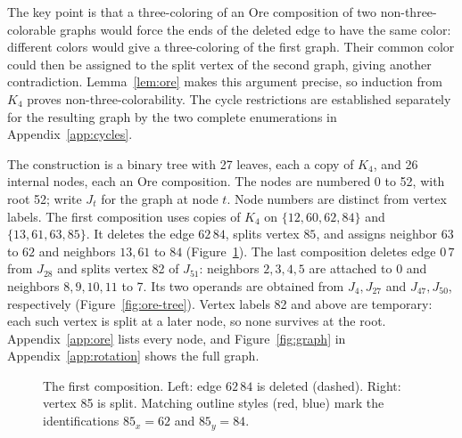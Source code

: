 \documentclass[11pt]{article}
\begin{document}
The key point is that a three-coloring of an Ore composition of two
non-three-colorable graphs would force the ends of the deleted edge to
have the same color: different colors would give a three-coloring of the
first graph. Their common color could then be assigned to the split
vertex of the second graph, giving another contradiction. Lemma~\ref{lem:ore}
makes this argument precise, so induction from $K_4$ proves
non-three-colorability. The cycle restrictions are established separately
for the resulting graph by the two complete enumerations in
Appendix~\ref{app:cycles}.

The construction is a binary tree with 27 leaves, each a copy of $K_4$,
and 26 internal nodes, each an Ore composition. The nodes are numbered
0 to 52, with root 52; write $J_t$ for the graph at node $t$. Node
numbers are distinct from vertex labels.
The first composition uses copies of $K_4$ on
$\{12,60,62,84\}$ and $\{13,61,63,85\}$. It deletes the edge $62\,84$,
splits vertex $85$, and assigns neighbor $63$ to $62$ and neighbors $13,61$
to $84$ (Figure~\ref{fig:ore-step}). The last
composition deletes edge $0\,7$ from $J_{28}$ and splits vertex 82 of
$J_{51}$: neighbors $2,3,4,5$ are attached to 0 and neighbors $8,9,10,11$
to 7. Its two operands are obtained from $J_4,J_{27}$ and $J_{47},J_{50}$,
respectively (Figure~\ref{fig:ore-tree}). Vertex labels 82 and above are
temporary: each such vertex is split at a later node, so none survives
at the root. Appendix~\ref{app:ore} lists every node, and
Figure~\ref{fig:graph} in Appendix~\ref{app:rotation} shows the full graph.

\begingroup
\setlength{\intextsep}{6pt}
\begin{figure}[H]
\centering
{}
\caption{The first composition. Left: edge $62\,84$ is deleted (dashed).
Right: vertex 85 is split. Matching outline styles (red, blue) mark the identifications
$85_x=62$ and $85_y=84$.}
\label{fig:ore-step}
\end{figure}
\end{document}
